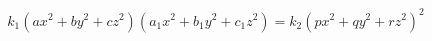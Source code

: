 \begin{proposition}\label{eq:119}
\[
    k_1(ax^2+by^2+cz^2)(a_1x^2+b_1y^2+c_1z^2)=k_2(px^2+qy^2+rz^2)^2
\]
\end{proposition}
